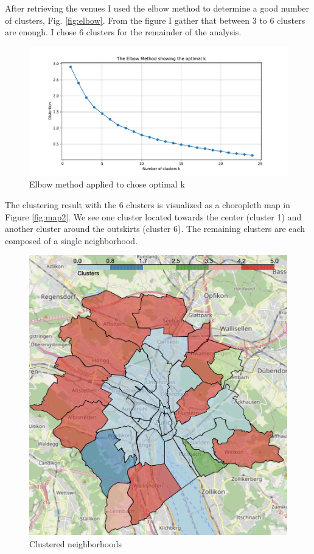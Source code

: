 \documentclass[a4paper,12pt,english]{article}
\begin{document}
After retrieving the venues I used the elbow method to determine a good number of clusters, Fig. \ref{fig:elbow}. From the figure I gather that between 3 to 6 clusters are enough. I chose 6 clusters for the remainder of the analysis.
\begin{figure}
\centering
\includegraphics[width=1\linewidth]{elbow}
\caption{Elbow method applied to chose optimal k}
\end{figure}\label{fig:elbow}

The clustering result with the 6 clusters is visualized as a choropleth map in Figure \ref{fig:map2}. We see one cluster located towards the center (cluster 1) and another cluster around the outskirts (cluster 6). The remaining clusters are each composed of a single neighborhood.

\begin{figure}[h]
\centering
\includegraphics[width=1\linewidth]{map2}
\caption{Clustered neighborhoods}
\end{figure}\label{fig:map2}
\end{document}

